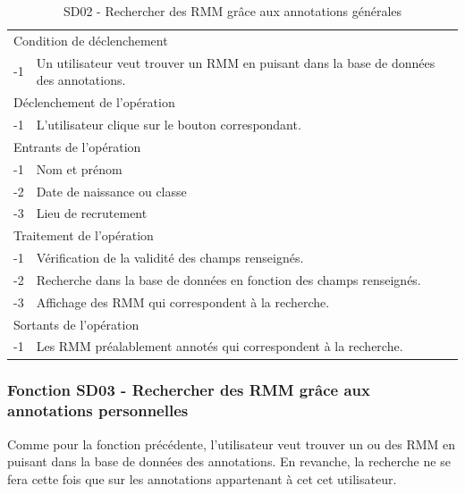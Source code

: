 \documentclass[a4paper]{article}
\begin{document}
\begin{table}[H]
  \centering
   \small
	\begin{tabular}{|c|p{12cm}|}
   		\hline
   			\rowcolor{lightgray}\multicolumn{2}{|c|}{\textbf{SD02 - Rechercher des RMM grâce aux annotations générales}} \\
   		\hline
   			\multicolumn{2}{|l|}{Condition de d\'eclenchement} \\
   		\hline
   			-1 & Un utilisateur veut trouver un RMM en puisant dans la base de données des annotations. \\
   		\hline
   			\multicolumn{2}{|l|}{D\'eclenchement de l'op\'eration} \\
   		\hline
   			-1 & L'utilisateur clique sur le bouton correspondant. \\
   		\hline
   			\multicolumn{2}{|l|}{Entrants de l'op\'eration} \\
   		\hline
   			-1 & Nom et prénom \\
        	-2 & Date de naissance ou classe \\ 
        	-3 & Lieu de recrutement \\
   		\hline
   			\multicolumn{2}{|l|}{Traitement de l'op\'eration} \\
  		\hline
  			-1 & Vérification de la validité des champs renseignés. \\
   			-2 & Recherche dans la base de données en fonction des champs renseignés. \\
        	-3 & Affichage des RMM qui correspondent à la recherche. \\
   		\hline
   			\multicolumn{2}{|l|}{Sortants de l'op\'eration} \\
   		\hline
   			-1 & Les RMM préalablement annotés qui correspondent à la recherche. \\
   		\hline
	\end{tabular}
  \caption{SD02 - Rechercher des RMM grâce aux annotations générales}
  \normalsize
  \label{tab:SD02}
\end{table}

\subsubsection{Fonction SD03 - Rechercher des RMM grâce aux annotations personnelles}

Comme pour la fonction précédente, l'utilisateur veut trouver un ou des RMM en puisant dans la base de données des annotations. En revanche, la recherche ne se fera cette fois que sur les annotations appartenant à cet cet utilisateur. 
\\
\end{document}
